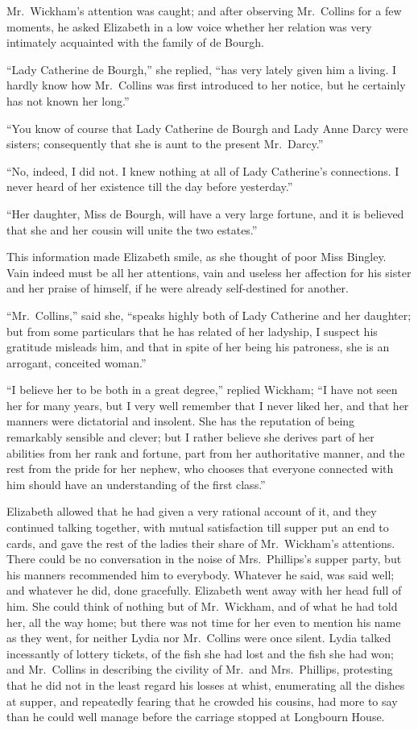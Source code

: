 \documentclass[12pt,english]{book}
\begin{document}
Mr.\ Wickham's attention was caught; and after observing Mr.\ Collins
for a few moments, he asked Elizabeth in a low voice whether her relation
was very intimately acquainted with the family of de Bourgh.

{}``Lady Catherine de Bourgh,'' she replied, {}``has very lately
given him a living. I hardly know how Mr.\ Collins was first introduced
to her notice, but he certainly has not known her long.''

{}``You know of course that Lady Catherine de Bourgh and Lady Anne
Darcy were sisters; consequently that she is aunt to the present Mr.\ Darcy.''

{}``No, indeed, I did not. I knew nothing at all of Lady Catherine's
connections. I never heard of her existence till the day before yesterday.''

{}``Her daughter, Miss de Bourgh, will have a very large fortune,
and it is believed that she and her cousin will unite the two estates.''

This information made Elizabeth smile, as she thought of poor Miss
Bingley. Vain indeed must be all her attentions, vain and useless
her affection for his sister and her praise of himself, if he were
already self-destined for another.

{}``Mr.\ Collins,'' said she, {}``speaks highly both of Lady Catherine
and her daughter; but from some particulars that he has related of
her ladyship, I suspect his gratitude misleads him, and that in spite
of her being his patroness, she is an arrogant, conceited woman.''

{}``I believe her to be both in a great degree,'' replied Wickham;
{}``I have not seen her for many years, but I very well remember
that I never liked her, and that her manners were dictatorial and
insolent. She has the reputation of being remarkably sensible and
clever; but I rather believe she derives part of her abilities from
her rank and fortune, part from her authoritative manner, and the
rest from the pride for her nephew, who chooses that everyone connected
with him should have an understanding of the first class.''

Elizabeth allowed that he had given a very rational account of it,
and they continued talking together, with mutual satisfaction till
supper put an end to cards, and gave the rest of the ladies their
share of Mr.\ Wickham's attentions. There could be no conversation
in the noise of Mrs.\ Phillips's supper party, but his manners recommended
him to everybody. Whatever he said, was said well; and whatever he
did, done gracefully. Elizabeth went away with her head full of him.
She could think of nothing but of Mr.\ Wickham, and of what he had
told her, all the way home; but there was not time for her even to
mention his name as they went, for neither Lydia nor Mr.\ Collins
were once silent. Lydia talked incessantly of lottery tickets, of
the fish she had lost and the fish she had won; and Mr.\ Collins
in describing the civility of Mr.\ and Mrs.\ Phillips, protesting
that he did not in the least regard his losses at whist, enumerating
all the dishes at supper, and repeatedly fearing that he crowded his
cousins, had more to say than he could well manage before the carriage
stopped at Longbourn House.
\end{document}
